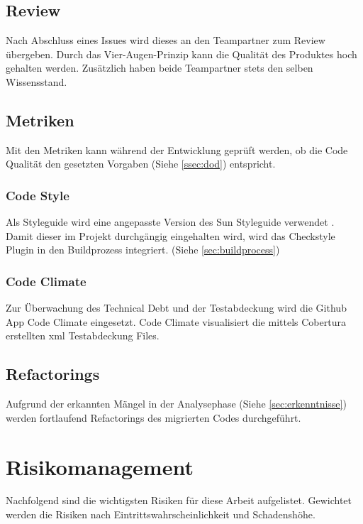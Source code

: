 \documentclass[11pt,a4paper,english,oneside]{book}
\numberwithin{equation}{chapter}
\begin{document}
	\subsection{Review}
	Nach Abschluss eines Issues wird dieses an den Teampartner zum Review übergeben. Durch das Vier-Augen-Prinzip kann die Qualität des Produktes hoch gehalten werden. Zusätzlich haben beide Teampartner stets den selben Wissensstand.
	
	\subsection{Metriken} \label{ssec:metriken}
	Mit den Metriken kann während der Entwicklung geprüft werden, ob die Code Qualität den gesetzten Vorgaben (Siehe \ref{ssec:dod}) entspricht.
	
	\subsubsection{Code Style}
	Als Styleguide wird eine angepasste Version des Sun Styleguide verwendet \cite{suncheckstyle}. Damit dieser im Projekt durchgängig eingehalten wird, wird das Checkstyle Plugin \cite{checkstyle} in den Buildprozess integriert. (Siehe \ref{sec:buildprocess})	
	
	\subsubsection{Code Climate}
	Zur Überwachung des Technical Debt und der Testabdeckung wird die Github App Code Climate \cite{codeclimate} eingesetzt. Code Climate visualisiert die mittels Cobertura \cite{cobertura} erstellten \gls{xml} Testabdeckung Files.
	
	\subsection{Refactorings}
	Aufgrund der erkannten Mängel in der Analysephase (Siehe \ref{sec:erkenntnisse}) werden fortlaufend Refactorings des migrierten Codes durchgeführt.
	
	\section{Risikomanagement}
	Nachfolgend sind die wichtigsten Risiken für diese Arbeit aufgelistet. Gewichtet werden die Risiken nach Eintrittswahrscheinlichkeit und Schadenshöhe. \cite{risikomanagement}
	
\end{document}
